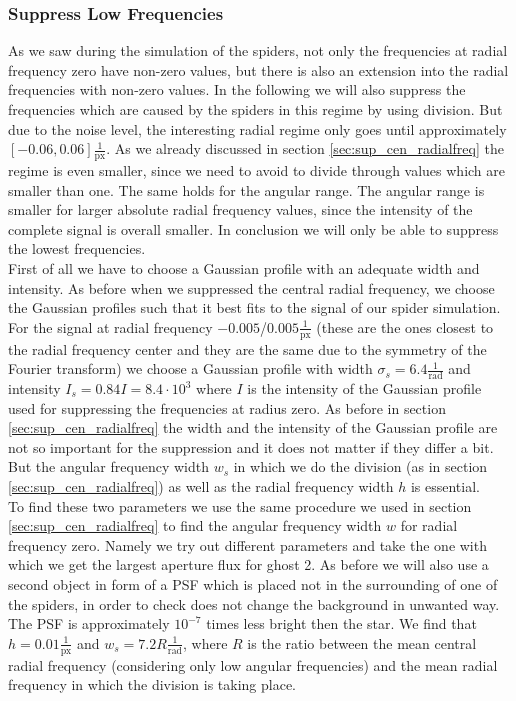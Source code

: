 \subsubsection{Suppress Low Frequencies}
As we saw during the simulation of the spiders, not only the frequencies at radial frequency zero have non-zero values, but there is also an extension into the radial frequencies with non-zero values. In the following we will also suppress the frequencies which are caused by the spiders in this regime by using division. But due to the noise level, the interesting radial regime only goes until approximately $[-0.06, 0.06] \frac{1}{\mathrm{px}}$. As we already discussed in section \ref{sec:sup_cen_radialfreq} the regime is even smaller, since we need to avoid to divide through values which are smaller than one. The same holds for the angular range. The angular range is smaller for larger absolute radial frequency values, since the intensity of the complete signal is overall smaller. In conclusion we will only be able to suppress the lowest frequencies.\\
First of all we have to choose a Gaussian profile with an adequate width and intensity. As before when we suppressed the central radial frequency, we choose the Gaussian profiles such that it best fits to the signal of our spider simulation. For the signal at radial frequency $-0.005$/$0.005 \frac{1}{\mathrm{px}}$ (these are the ones closest to the radial frequency center and they are the same due to the symmetry of the Fourier transform) we choose a Gaussian profile with width $\sigma_s = 6.4 \frac{1}{\mathrm{rad}}$ and intensity $I_s = 0.84 I = 8.4 \cdot 10^3$ where $I$ is the intensity of the Gaussian profile used for suppressing the frequencies at radius zero. As before in section \ref{sec:sup_cen_radialfreq} the width and the intensity of the Gaussian profile are not so important for the suppression and it does not matter if they differ a bit. But the angular frequency width $w_s$ in which we do the division (as in section \ref{sec:sup_cen_radialfreq}) as well as the radial frequency width $h$ is essential.\\
To find these two parameters we use the same procedure we used in section \ref{sec:sup_cen_radialfreq} to find the angular frequency width $w$ for radial frequency zero. Namely we try out different parameters and take the one with which we get the largest aperture flux for ghost 2. As before we will also use a second object in form of a PSF which is placed not in the surrounding of one of the spiders, in order to check does not change the background in unwanted way. The PSF is approximately $10^{-7}$ times less bright then the star. We find that $h = 0.01 \frac{1}{\mathrm{px}}$ and $w_s = 7.2 R \frac{1}{\mathrm{rad}}$, where $R$ is the ratio between the mean central radial frequency (considering only low angular frequencies) and the mean radial frequency in which the division is taking place.\\
